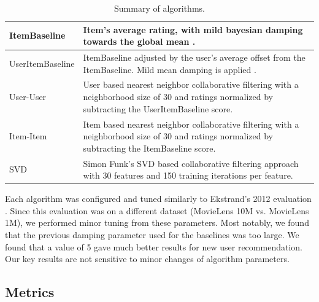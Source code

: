 \documentclass[letterpaper]{sig-alternate}
\begin{document}
  \begin{table}[ht!]
    \centering
    \begin{tabular}{|p{6em}|p{18em}|}
      \hline
      ItemBaseline       & Item's average rating, with mild bayesian damping towards the global mean \cite{funk_netflix_2006}. \\\hline
      UserItem\-Baseline & ItemBaseline adjusted by the user's average offset from the ItemBaseline. Mild mean damping is applied \cite{funk_netflix_2006}. \\\hline
      User-User          & User based nearest neighbor collaborative filtering \cite{resnick1994grouplens} with a neighborhood size of 30 and ratings normalized by subtracting the UserItemBaseline score. \\\hline
      Item-Item          & Item based nearest neighbor collaborative filtering \cite{sarwar2001item} with a neighborhood size of 30 and ratings normalized by subtracting the ItemBaseline score.   \\\hline
      SVD                & Simon Funk's SVD based collaborative filtering approach \cite{funk_netflix_2006} with 30 features and 150 training iterations per feature. \\\hline
    \end{tabular}
    \caption{Summary of algorithms.}
    \label{tbl:algo}
  \end{table}
  
  Each algorithm was configured and tuned similarly to Ekstrand's 2012 evaluation \cite{ekstrand2012recommenders}.
  Since this evaluation was on a different dataset (MovieLens 10M vs. MovieLens 1M), we performed minor tuning from these parameters.
  Most notably, we found that the previous damping parameter used for the baselines was too large.
  We found that a value of 5 gave much better results for new user recommendation.
  Our key results are not sensitive to minor changes of algorithm parameters.


  \subsection*{Metrics}
\end{document}
